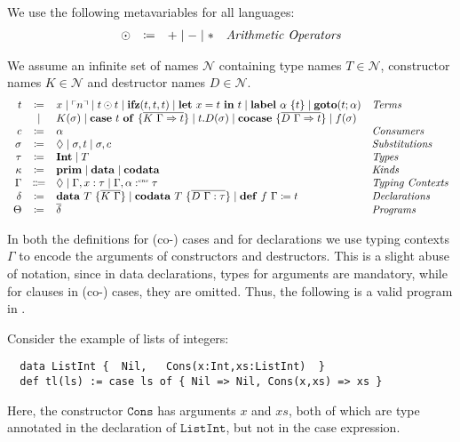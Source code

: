\begin{definition}
  We use the following metavariables for all languages:
  \[
    \begin{array}{rcll}
      \odot  & \coloneqq & + \mid - \mid * & \emph{Arithmetic Operators}
    \end{array}
  \]
\end{definition}

\begin{definition}
  We assume an infinite set of names $\mathcal{N}$ containing type names $T\in\mathcal{N}$, constructor names $K\in\mathcal{N}$ and destructor names $D\in\mathcal{N}$.
  \[
    \begin{array}{r c l l}
      t & \coloneqq & x \mid \lit{n} \mid t \odot t \mid \ifz{t}{t}{t} \mid \letin{x}{t}{t} \mid \lab{\alpha}{t} \mid \goto{t}{\alpha}  & \emph{Terms}\\
      & \mid & K(\sigma) \mid \caseof{t}{\overline{K\ \Gamma \Rightarrow t}} \mid t.D(\sigma) \mid \cocase{\overline{D\ \Gamma \Rightarrow t}} \mid f(\sigma)& \\
      c & \coloneqq & \alpha & \emph{Consumers}\\
      \sigma & \coloneqq & \nil \mid \sigma,t \mid \sigma, c & \emph{Substitutions}\\
      \tau & \coloneqq & \tyint \mid T & \emph{Types} \\
      \kappa & \coloneq & \mathbf{prim}\mid\mathbf{data} \mid \mathbf{codata} & \emph{Kinds} \\
      \Gamma & \Coloneqq & \nil \mid \Gamma, x : \tau \mid \Gamma, \alpha \cnt \tau & \emph{Typing Contexts} \\
      \delta & \coloneqq & \mathbf{data}\ T\ \{ \overline{K\ \Gamma} \}  \mid \mathbf{codata}\ T\ \{ \overline{D\ \Gamma : \tau}\} \mid \defi{f\ \Gamma}{t} & \emph{Declarations}\\
      \Theta & \coloneqq & \overline{\delta} & \emph{Programs}\\
    \end{array}
  \]
\end{definition}
In both the definitions for (co-) cases and for declarations we use typing contexts $\Gamma$ to encode the arguments of constructors and destructors.
This is a slight abuse of notation, since in data declarations, types for arguments are mandatory, while for clauses in (co-) cases, they are omitted.
Thus, the following is a valid program in \surfacelang{}.
\begin{example}
  \label{ex:fun-syntax}
  Consider the example of lists of integers: 
  \begin{lstlisting}
  data ListInt {  Nil,   Cons(x:Int,xs:ListInt)  }
  def tl(ls) := case ls of { Nil => Nil, Cons(x,xs) => xs }
  \end{lstlisting}
  Here, the constructor $\mathtt{Cons}$ has arguments $x$ and $xs$, both of which are type annotated in the declaration of $\mathtt{ListInt}$, but not in the case expression.
\end{example}

